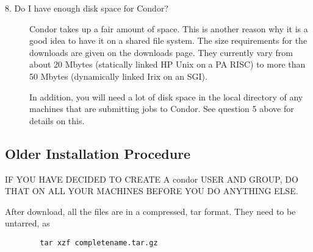 \begin{description}
\item[8. Do I have enough disk space for Condor?]

Condor takes up a fair amount of space.
This is another reason why it is a good idea to have it on a shared
file system.
The size requirements for the downloads are given on the
downloads page.
They currently vary from about 20 Mbytes (statically linked HP Unix
on a PA RISC)
to more than 50 Mbytes (dynamically linked Irix on an SGI).



In addition, you will need a lot of disk space in the local directory
of any machines that are submitting jobs to Condor.  See question 5
above for details on this.

\end{description}

\subsection{\label{sec:install-procedure}
Older Installation Procedure}

IF YOU HAVE DECIDED TO CREATE A condor USER AND GROUP, DO
THAT ON ALL YOUR MACHINES BEFORE YOU DO ANYTHING ELSE.

After download, all the files are in a compressed, tar format.
They need to be untarred, as
\begin{verbatim}
        tar xzf completename.tar.gz
\end{verbatim}

